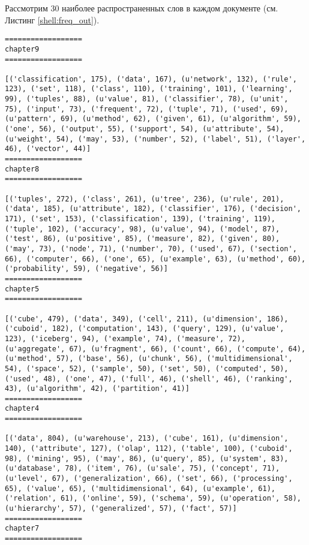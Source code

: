\documentclass[12pt, a4paper] {article}
\begin{document}
Рассмотрим 30 наиболее распространенных слов в каждом документе (см. Листинг \ref{shell:freq_out}).

\begin{lstlisting}[label=shell:freq_out]
==================
chapter9
==================

[('classification', 175), ('data', 167), (u'network', 132), ('rule', 123), ('set', 118), ('class', 110), ('training', 101), ('learning', 99), ('tuples', 88), (u'value', 81), ('classifier', 78), (u'unit', 75), ('input', 73), ('frequent', 72), ('tuple', 71), ('used', 69), (u'pattern', 69), (u'method', 62), ('given', 61), (u'algorithm', 59), ('one', 56), ('output', 55), ('support', 54), (u'attribute', 54), (u'weight', 54), ('may', 53), ('number', 52), ('label', 51), ('layer', 46), ('vector', 44)]
==================
chapter8
==================

[('tuples', 272), ('class', 261), (u'tree', 236), (u'rule', 201), ('data', 185), (u'attribute', 182), ('classifier', 176), ('decision', 171), ('set', 153), ('classification', 139), ('training', 119), ('tuple', 102), ('accuracy', 98), (u'value', 94), ('model', 87), ('test', 86), (u'positive', 85), ('measure', 82), ('given', 80), ('may', 73), ('node', 71), ('number', 70), ('used', 67), ('section', 66), ('computer', 66), ('one', 65), (u'example', 63), (u'method', 60), ('probability', 59), ('negative', 56)]
==================
chapter5
==================

[('cube', 479), ('data', 349), ('cell', 211), (u'dimension', 186), ('cuboid', 182), ('computation', 143), ('query', 129), (u'value', 123), ('iceberg', 94), ('example', 74), ('measure', 72), (u'aggregate', 67), (u'fragment', 66), ('count', 66), ('compute', 64), (u'method', 57), ('base', 56), (u'chunk', 56), ('multidimensional', 54), ('space', 52), ('sample', 50), ('set', 50), ('computed', 50), ('used', 48), ('one', 47), ('full', 46), ('shell', 46), ('ranking', 43), (u'algorithm', 42), ('partition', 41)]
==================
chapter4
==================

[('data', 804), (u'warehouse', 213), ('cube', 161), (u'dimension', 140), ('attribute', 127), ('olap', 112), ('table', 100), ('cuboid', 98), ('mining', 95), ('may', 86), (u'query', 85), (u'system', 83), (u'database', 78), ('item', 76), (u'sale', 75), ('concept', 71), (u'level', 67), ('generalization', 66), ('set', 66), ('processing', 65), ('value', 65), ('multidimensional', 64), (u'example', 61), ('relation', 61), ('online', 59), ('schema', 59), (u'operation', 58), (u'hierarchy', 57), ('generalized', 57), ('fact', 57)]
==================
chapter7
==================


\end{lstlisting}
\end{document}

